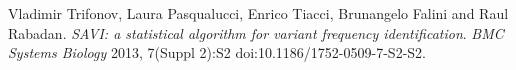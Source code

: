 \documentclass[letterpaper,14pt]{memoir}
\begin{document}
\renewcommand\bibname{References}

\begin{thebibliography}{9}

Vladimir Trifonov, Laura Pasqualucci, Enrico Tiacci, Brunangelo Falini and Raul Rabadan.
\textit{SAVI: a statistical algorithm for variant frequency identification}.
\textit{BMC Systems Biology} 2013, 7(Suppl 2):S2 doi:10.1186/1752-0509-7-S2-S2.
 
\end{thebibliography}
\end{document}
